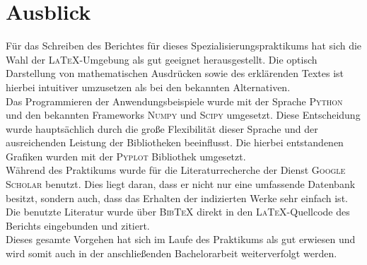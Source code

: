 \chapter{Ausblick}
Für das Schreiben des Berichtes für dieses Spezialisierungspraktikums hat sich die Wahl der \textsc{LaTeX}-Umgebung als gut geeignet herausgestellt. Die optisch Darstellung von mathematischen Ausdrücken sowie des erklärenden Textes ist hierbei intuitiver umzusetzen als bei den bekannten Alternativen.\\

Das Programmieren der Anwendungsbeispiele wurde mit der Sprache \textsc{Python} und den bekannten Frameworks \textsc{Numpy} und \textsc{Scipy} umgesetzt. Diese Entscheidung wurde hauptsächlich durch die große Flexibilität dieser Sprache und der ausreichenden Leistung der Bibliotheken beeinflusst. Die hierbei entstandenen Grafiken wurden mit der \textsc{Pyplot} Bibliothek umgesetzt.\\ 

Während des Praktikums wurde für die Literaturrecherche der Dienst \textsc{Google Scholar} benutzt. Dies liegt daran, dass er nicht nur eine umfassende Datenbank besitzt, sondern auch, dass das Erhalten der indizierten Werke sehr einfach ist.\\
Die benutzte Literatur wurde über \textsc{BibTeX} direkt in den \textsc{LaTeX}-Quellcode des Berichts eingebunden und zitiert.\\

Dieses gesamte Vorgehen hat sich im Laufe des Praktikums als gut erwiesen und wird somit auch in der anschließenden Bachelorarbeit weiterverfolgt werden.